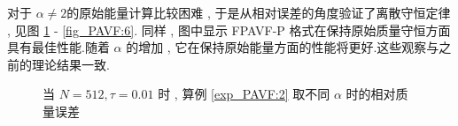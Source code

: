   对于 $\alpha\neq 2$的原始能量计算比较困难 , 于是从相对误差的角度验证了离散守恒定律 , 见图 \ref{fig_PAVF:5} - \ref{fig_PAVF:6}.
  同样 , 图中显示 FPAVF-P 格式在保持原始质量守恒方面具有最佳性能.随着 $\alpha$ 的增加 , 它在保持原始能量方面的性能将更好.这些观察与之前的理论结果一致.

  \begin{figure}[H]
	\begin{center}
	\caption{当 $N = 512 , \tau=0.01$ 时 , 算例 \ref{exp_PAVF:2} 取不同 $\alpha$ 时的相对质量误差}
	\label{fig_PAVF:5}
	\end{center}
	\end{figure}
	
